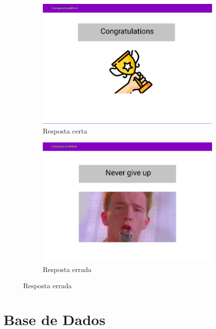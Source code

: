 \documentclass[11pt,a4paper]{report}
\begin{document}
\begin{figure}
    \begin{subfigure}[h]{0.5\linewidth}
        \includegraphics[width=\linewidth]{MockUserCongratulations.png}
        \caption{Resposta certa}
        \label{fig:MockUserCongratulations}
    \end{subfigure}
    \begin{subfigure}[h]{0.5\linewidth}
        \includegraphics[width=\linewidth]{MockUserTryAgain.png}
        \caption{Resposta errada}
        \label{fig:MockUserTryAgain}
    \end{subfigure}
\end{figure}

\chapter{Base de Dados}
\end{document}
